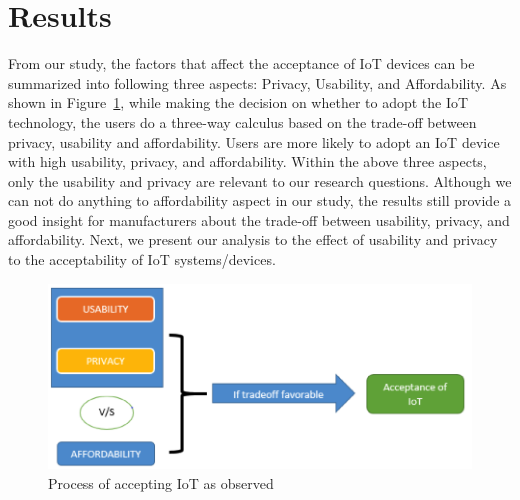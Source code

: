 

\section{Results}
From our study, the factors that affect the acceptance of IoT devices can be summarized into following three aspects: Privacy, Usability, and Affordability. As shown in Figure~\ref{fig:AcceptingProcess}, while making the decision on whether to adopt the IoT technology, the users do a three-way calculus based on the trade-off between privacy, usability and affordability. Users are more likely to adopt an IoT device with high usability, privacy, and affordability. Within the above three aspects, only the usability and privacy  are relevant to our research questions. Although we can not do anything to affordability aspect in our study, the results still provide a good insight for manufacturers about the trade-off between usability, privacy, and affordability. Next, we present our analysis to the effect of usability and privacy to the acceptability of IoT systems/devices.

\begin{figure}[htb]
	\centering
	\includegraphics[width=0.6\columnwidth]{figures/AcceptingProcess.png}
	\caption{Process of accepting IoT as observed}
	\label{fig:AcceptingProcess}
\end{figure}


